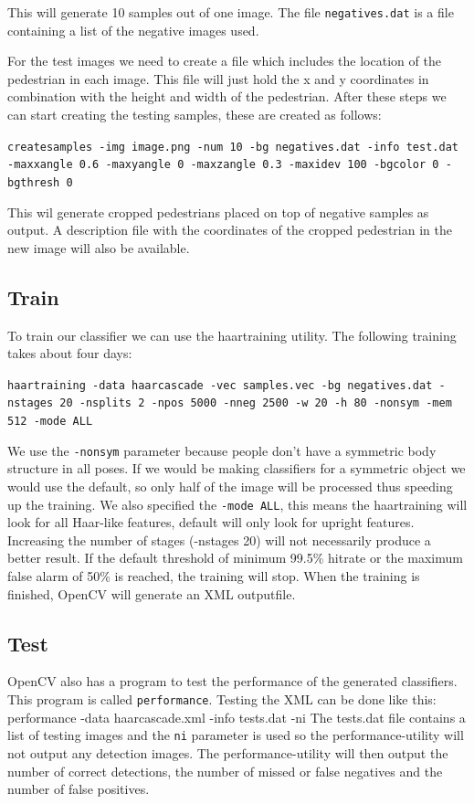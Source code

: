 \documentclass{article}
\begin{document}
This will generate 10 samples out of one image.
The file \texttt{negatives.dat} is a file containing a list of the negative images used.

For the test images we need to create a file which includes the location of the pedestrian in each image. This file will just hold the x and y coordinates in combination with the height and width of the pedestrian.
After these steps we can start creating the testing samples, these are created as follows:

\texttt{createsamples -img image.png -num 10 -bg negatives.dat -info test.dat -maxxangle 0.6 -maxyangle 0 -maxzangle 0.3 -maxidev 100 -bgcolor 0 -bgthresh 0}

This wil generate cropped pedestrians placed on top of negative samples as output. A description file with the coordinates of the cropped pedestrian in the new image will also be available.




\subsection{Train}

To train our classifier we can use the haartraining utility. The following training takes about four days:

\texttt{haartraining -data haarcascade -vec samples.vec -bg negatives.dat -nstages 20 -nsplits 2 -npos 5000 -nneg 2500 -w 20 -h 80 -nonsym -mem 512 -mode ALL}

We use the \texttt{-nonsym} parameter because people don't have a symmetric body structure in all poses. If we would be making classifiers for a symmetric object we would use the default, so only half of the image will be processed  thus speeding up the training. We also specified the \texttt{-mode ALL}, this means the haartraining will look for all Haar-like features, default will only look for upright features.
Increasing the number of stages (-nstages 20) will not necessarily produce a better result. If the default threshold of minimum 99.5\% hitrate or the maximum false alarm of 50\% is reached, the training will stop.
When the training is finished, OpenCV will generate an XML outputfile.

\subsection{Test}
OpenCV also has a program to test the performance of the generated classifiers. This program is called \texttt{performance}. Testing the XML can be done like this:
performance -data haarcascade.xml -info tests.dat -ni
The tests.dat file contains a list of testing images and the \texttt{ni} parameter is used so the performance-utility will not output any detection images.
The performance-utility will then output the number of correct detections, the number of missed or false negatives and the number of false positives.
\end{document}
